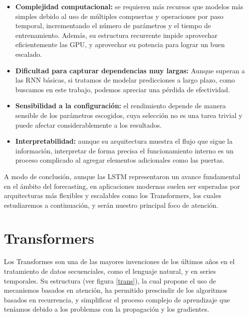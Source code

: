 \begin{itemize}
	\item \textbf{Complejidad computacional:} se requieren más recursos que modelos más simples debido al uso de múltiples compuertas y operaciones por paso temporal, incrementando el número de parámetros y el tiempo de entrenamiento. Además, su estructura recurrente impide aprovechar eficientemente las GPU, y aprovechar su potencia para lograr un buen escalado.
	
	\item \textbf{Dificultad para capturar dependencias muy largas:} Aunque superan a las RNN básicas, si tratamos de modelar predicciones a largo plazo, como buscamos en este trabajo, podemos apreciar una pérdida de efectividad.
	
	\item \textbf{Sensibilidad a la configuración:} el rendimiento depende de manera sensible de los parámetros escogidos, cuya selección no es una tarea trivial y puede afectar considerablemente a los resultados.
	
	\item \textbf{Interpretabilidad:} aunque su arquitectura muestra el flujo que sigue la información, interpretar de forma precisa el funcionamiento interno es un proceso complicado al agregar elementos adicionales como las puertas.

\end{itemize}

A modo de conclusión, aunque las LSTM representaron un avance fundamental en el ámbito del forecasting, en aplicaciones modernas suelen ser superadas por arquitecturas más flexibles y escalables como los Transformers, los cuales estudiaremos a continuación, y serán nuestro principal foco de atención.

\section{Transformers}

Los Transformes son una de las mayores invenciones de los últimos años en el tratamiento de datos secuenciales, como el lenguaje natural, y en series temporales. Su estructura (ver figura \ref{trans}), la cual propone el uso de mecanismos basados en atención, ha permitido prescindir de los algoritmos basados en recurrencia, y simplificar el proceso complejo de aprendizaje que teníamos debido a los problemas con la propagación y los gradientes.\\

